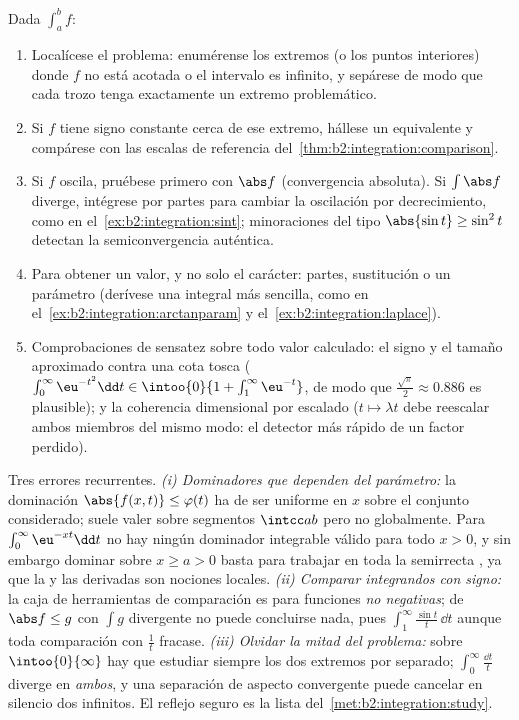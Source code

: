 \begin{method}\label{met:b2:integration:study}
Dada $\int_a^b f$:
\begin{enumerate}
  \item Localícese el problema: enumérense los extremos (o los
        puntos interiores) donde $f$ no está acotada o el intervalo
        es infinito, y sepárese de modo que cada trozo tenga
        exactamente un extremo problemático.
  \item Si $f$ tiene signo constante cerca de ese extremo, hállese
        un equivalente y compárese con las escalas de referencia del~\cref{thm:b2:integration:comparison}.
  \item Si $f$ oscila, pruébese primero con $\abs f$ (convergencia
        absoluta). Si $\int\abs f$ diverge, intégrese por partes
        para cambiar la oscilación por decrecimiento, como en el~\cref{ex:b2:integration:sint}; minoraciones del tipo
        $\abs{\sin t} \geq \sin^2t$ detectan la semiconvergencia
        auténtica.
  \item Para obtener un valor, y no solo el carácter: partes,
        sustitución o un parámetro (derívese una integral más
        sencilla, como en el~\cref{ex:b2:integration:arctanparam} y
        el~\cref{ex:b2:integration:laplace}).
  \item Comprobaciones de sensatez sobre todo valor calculado: el
        signo y el tamaño aproximado contra una cota tosca
        ($\int_0^\infty \eu^{-t^2}\dd t \in \intoo{0}{1 +
        \int_1^\infty \eu^{-t}}$, de modo que $\frac{\sqrt\pi}{2}
        \approx 0.886$ es plausible); y la coherencia dimensional
        por escalado ($t \mapsto \lambda t$ debe reescalar ambos
        miembros del mismo modo: el detector más rápido de un factor
        perdido).
\end{enumerate}
\end{method}

\begin{remark}
Tres errores recurrentes. \emph{(i) Dominadores que dependen del
parámetro:} la dominación $\abs{f(x,t)} \leq \varphi(t)$ ha de ser
uniforme en $x$ sobre el conjunto considerado; suele valer sobre
segmentos $\intcc ab$ pero no globalmente. Para
$\int_0^\infty\eu^{-xt}\dd t$ no hay ningún dominador integrable
válido para todo $x > 0$, y sin embargo dominar sobre $x \geq a > 0$
basta para trabajar en toda la semirrecta , ya que la
 y las derivadas son nociones locales. \emph{(ii)
Comparar integrandos con signo:} la caja de herramientas de
comparación es para funciones \emph{no negativas}; de $\abs f \leq
g$ con $\int g$ divergente no puede concluirse nada, pues
$\int_1^\infty\frac{\sin t}t\,\dd t$  aunque toda comparación
con $\frac1t$ fracase. \emph{(iii) Olvidar la mitad del problema:}
sobre $\intoo{0}{\infty}$ hay que estudiar siempre los dos extremos
por separado; $\int_0^\infty\frac{\dd t}{t}$ diverge en
\emph{ambos}, y una separación de aspecto convergente puede cancelar
en silencio dos infinitos. El reflejo seguro es la lista del~\cref{met:b2:integration:study}.
\end{remark}

